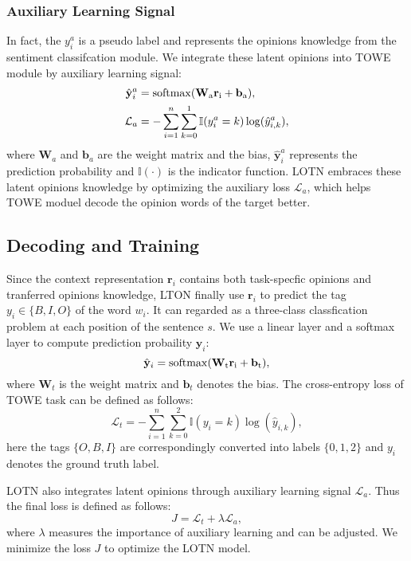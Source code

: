 \documentclass[letterpaper]{article} \usepackage{aaai20}  \usepackage{times}  \usepackage{helvet} \usepackage{courier}  \usepackage[hyphens]{url}  \usepackage{graphicx} \urlstyle{rm} \def\UrlFont{\rm}  \usepackage{graphicx}
\begin{document}
\subsubsection{Auxiliary Learning Signal}
In fact, the $y^a_i$ is a pseudo label and represents the opinions knowledge from the sentiment classifcation module. We integrate these latent opinions into TOWE module by auxiliary learning signal:
\begin{align}
	\hat{\mathbf{y}}^a_i&=\rm{softmax}(\mathbf{W}_a\mathbf{r}_i+\mathbf{b}_a),\\
	\mathcal{L}_a &=-\sum_{i=1}^{n}\sum_{k=0}^{1}\mathbb{I}(y^a_i=k)\log(\hat{y}^a_{i,k}),
\end{align}
where $\mathbf{W}_a$ and $\mathbf{b}_a$ are the weight matrix and  the bias, $\hat{\mathbf{y}}^a_i$ represents the prediction probability and $\mathbb{I}(\cdot)$ is the indicator function. LOTN embraces these latent opinions knowledge by optimizing the auxiliary loss $\mathcal{L}_a$, which helps TOWE moduel decode the opinion words of the target better.

\subsection{Decoding and Training}
Since the context representation $\mathbf{r}_i$ contains both task-specfic opinions and tranferred opinions knowledge, LTON finally use $\mathbf{r}_i$ to predict the tag $y_i\in\{B,I,O\}$ of the word $w_i$. It can regarded as a three-class classfication problem at each position of the sentence $s$. We use a linear layer and a softmax layer to compute prediction probaility $\hat{\mathbf{y}}_i$:
\begin{equation}
	\hat{\mathbf{y}}_i=\rm{softmax}(\mathbf{W}_t\mathbf{r}_i+\mathbf{b}_t),
\end{equation}
where $\mathbf{W}_t$ is the weight matrix and $\mathbf{b}_t$ denotes the bias. The cross-entropy loss of TOWE task can be defined as follows:
\begin{equation}
	\mathcal{L}_t=- \sum_{i=1}^{n}\sum_{k=0}^{2}\mathbb{I}(y_i=k)\log(\hat{y}_{i,k}),
\end{equation}
here the tags $\{O, B, I\}$ are correspondingly converted into labels $\{0, 1, 2\}$ and $y_i$ denotes the ground truth label.

LOTN also integrates latent opinions through auxiliary learning signal $\mathcal{L}_a$. Thus the final loss is defined as follows:
\begin{equation}
	J=\mathcal{L}_t+\lambda \mathcal{L}_a,
	\label{finalloss}
\end{equation}
where $\lambda$ measures the importance of auxiliary learning and can be adjusted. We minimize the loss $J$ to optimize the LOTN model.
\end{document}
